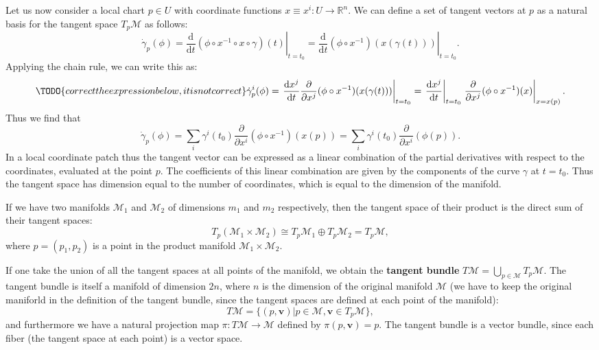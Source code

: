 Let us now consider a local chart \(p \in U\) with coordinate functions \(x \equiv x^i : U \to \mathbb{R}^n\). We can define a set of tangent vectors at \(p\) as a natural basis for the tangent space \(T_p \mathcal{M}\) as follows:
\[
    \dot{\gamma}_p(\phi) = \left. \frac{\mathrm{d}}{\mathrm{d} t} (\phi \circ x^{-1} \circ x \circ \gamma) (t)\right|_{t=t_0} = \left. \frac{\mathrm{d}}{\mathrm{d} t} (\phi \circ x^{-1}) (x(\gamma(t)))\right|_{t=t_0}.
\]
Applying the chain rule, we can write this as:
\[\TODO{correct the expression below, it is not correct}
    \dot{\gamma}_p^i(\phi) = \left. \frac{\mathrm{d} x^j}{\mathrm{d} t} \frac{\partial}{\partial x^j} (\phi \circ x^{-1}) (x(\gamma(t)))\right|_{t=t_0} = \left. \frac{\mathrm{d} x^j}{\mathrm{d} t}\right|_{t=t_0} \left. \frac{\partial}{\partial x^j} (\phi \circ x^{-1}) (x)\right|_{x=x(p)}.
\]
Thus we find that
\[
    \dot{\gamma}_p(\phi) = \sum_{i} \gamma^i(t_0) \frac{\partial}{\partial x^i} (\phi \circ x^{-1}) (x(p)) = \sum_{i} \gamma^i(t_0) \frac{\partial}{\partial x^i} (\phi(p)).
\]
In a local coordinate patch thus the tangent vector can be expressed as a linear combination of the partial derivatives with respect to the coordinates, evaluated at the point \(p\). The coefficients of this linear combination are given by the components of the curve \(\gamma\) at \(t=t_0\). Thus the tangent space has dimension equal to the number of coordinates, which is equal to the dimension of the manifold.

\begin{corollary}
    If we have two manifolds \(\mathcal{M}_1\) and \(\mathcal{M}_2\) of dimensions \(m_1\) and \(m_2\) respectively, then the tangent space of their product is the direct sum of their tangent spaces:
    \[
        T_p(\mathcal{M}_1 \times \mathcal{M}_2) \cong T_p\mathcal{M}_1 \oplus T_p\mathcal{M}_2 = T_p \mathcal{M},
    \]
    where \(p = (p_1, p_2)\) is a point in the product manifold \(\mathcal{M}_1 \times \mathcal{M}_2\).
\end{corollary}

\begin{definition}
    If one take the union of all the tangent spaces at all points of the manifold, we obtain the \textbf{tangent bundle} \(T\mathcal{M} = \bigcup_{p \in \mathcal{M}} T_p \mathcal{M}\). The tangent bundle is itself a manifold of dimension \(2n\), where \(n\) is the dimension of the original manifold \(\mathcal{M}\) (we have to keep the original maniforld in the definition of the tangent bundle, since the tangent spaces are defined at each point of the manifold):
    \[
        T\mathcal{M} = \{ (p,\mathbf{v}) | p \in \mathcal{M}, \mathbf{v} \in T_p \mathcal{M} \},
    \]
    and furthermore we have a natural projection map \(\pi : T\mathcal{M} \to \mathcal{M}\) defined by \(\pi(p,\mathbf{v}) = p\). The tangent bundle is a vector bundle, since each fiber (the tangent space at each point) is a vector space.
\end{definition}

